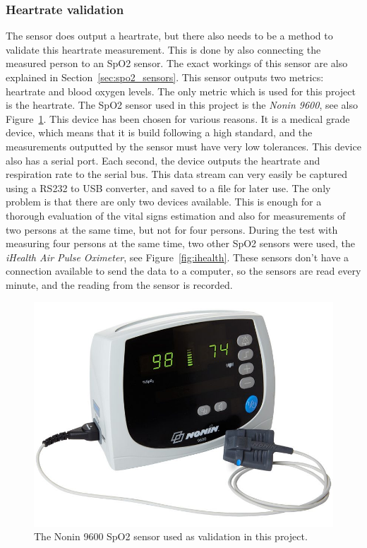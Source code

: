 \subsubsection{Heartrate validation}
The sensor does output a heartrate, but there also needs to be a method to validate this heartrate measurement. This is done by also connecting the measured person to an SpO2 sensor. The exact workings of this sensor are also explained in Section~\ref{sec:spo2_sensors}. This sensor outputs two metrics: heartrate and blood oxygen levels. The only metric which is used for this project is the heartrate. The SpO2 sensor used in this project is the \emph{Nonin 9600}, see also Figure~\ref{fig:nonin_9600}. This device has been chosen for various reasons. It is a medical grade device, which means that it is build following a high standard, and the measurements outputted by the sensor must have very low tolerances. This device also has a serial port. Each second, the device outputs the heartrate and respiration rate to the serial bus. This data stream can very easily be captured using a RS232 to USB converter, and saved to a file for later use. The only problem is that there are only two devices available. This is enough for a thorough evaluation of the vital signs estimation and also for measurements of two persons at the same time, but not for four persons. During the test with measuring four persons at the same time, two other SpO2 sensors were used, the \emph{iHealth Air Pulse Oximeter}, see Figure~\ref{fig:ihealth}. These sensors don't have a connection available to send the data to a computer, so the sensors are read every minute, and the reading from the sensor is recorded. 

\begin{figure}[t]
    \centering
    \includegraphics[width=.6\textwidth]{figures/validation/nonin_9600.jpg}
    \caption{The Nonin 9600 SpO2 sensor used as validation in this project.}
    \label{fig:nonin_9600}
\end{figure}

